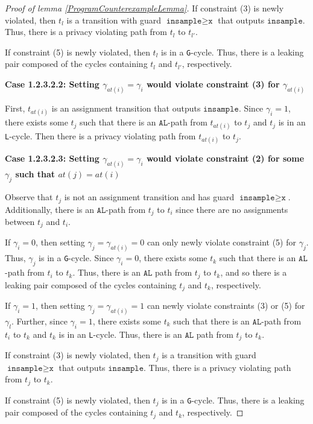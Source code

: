 \documentclass[12pt]{article}
\newcommand{\gguard}[1][x]{\texttt{insample}\geq#1}
\newcommand{\gcycle}{\texttt{G}-cycle}
\newcommand{\lcycle}{\texttt{L}-cycle}
\theoremstyle{definition}
\begin{document}
\begin{proof}[Proof of lemma \ref{ProgramCounterexampleLemma}]
    If constraint (3) is newly violated, then $t_l$ is a transition with guard $\gguard[\texttt{x}]$ that outputs $\texttt{insample}$. Thus, there is a privacy violating path from $t_l$ to $t_{l'}$. 

    If constraint (5) is newly violated, then $t_l$ is in a \gcycle. Thus, there is a leaking pair composed of the cycles containing $t_l$ and $t_{l'}$, respectively.

    \textbf{Case 1.2.3.2.2: Setting $\gamma_{at(i)}=\gamma_i$ would violate constraint (3) for $\gamma_{at(i)}$}

    First, $t_{at(i)}$ is an assignment transition that outputs $\texttt{insample}$. Since $\gamma_i = 1$, there exists some $t_j$ such that there is an $\texttt{AL}$-path from $t_{at(i)}$ to $t_j$ and $t_j$ is in an \lcycle. Then there is a privacy violating path from $t_{at(i)}$ to $t_j$.

    \textbf{Case 1.2.3.2.3: Setting $\gamma_{at(i)}=\gamma_i$ would violate constraint (2) for some $\gamma_j$ such that $at(j) = at(i)$}

    Observe that $t_j$ is not an assignment transition and has guard $\gguard[\texttt{x}]$. Additionally, there is an $\texttt{AL}$-path from $t_j$ to $t_i$ since there are no assignments between $t_j$ and $t_i$. 

    If $\gamma_i =0$, then setting $\gamma_j = \gamma_{at(i)} = 0$ can only newly violate constraint (5) for $\gamma_j$. Thus, $\gamma_j$ is in a \gcycle. Since $\gamma_i = 0$, there exists some $t_{k}$ such that there is an $\texttt{AL}$-path from $t_i$ to $t_{k}$. Thus, there is an $\texttt{AL}$ path from $t_j$ to $t_{k}$, and so there is a leaking pair composed of the cycles containing $t_j$ and $t_{k}$, respectively. 

    If $\gamma_i = 1$, then setting $\gamma_j = \gamma_{at(i)}=1$ can newly violate constraints (3) or (5) for $\gamma_l$. Further, since $\gamma_i =1$, there exists some $t_{k}$ such that there is an $\texttt{AL}$-path from $t_i$ to $t_{k}$ and $t_{k}$ is in an \lcycle. Thus, there is an $\texttt{AL}$ path from $t_j$ to $t_{k}$.
    
    If constraint (3) is newly violated, then $t_j$ is a transition with guard $\gguard[\texttt{x}]$ that outputs $\texttt{insample}$. Thus, there is a privacy violating path from $t_j$ to $t_{k}$. 

    If constraint (5) is newly violated, then $t_j$ is in a \gcycle. Thus, there is a leaking pair composed of the cycles containing $t_j$ and $t_{k}$, respectively.


\end{proof}
\end{document}
